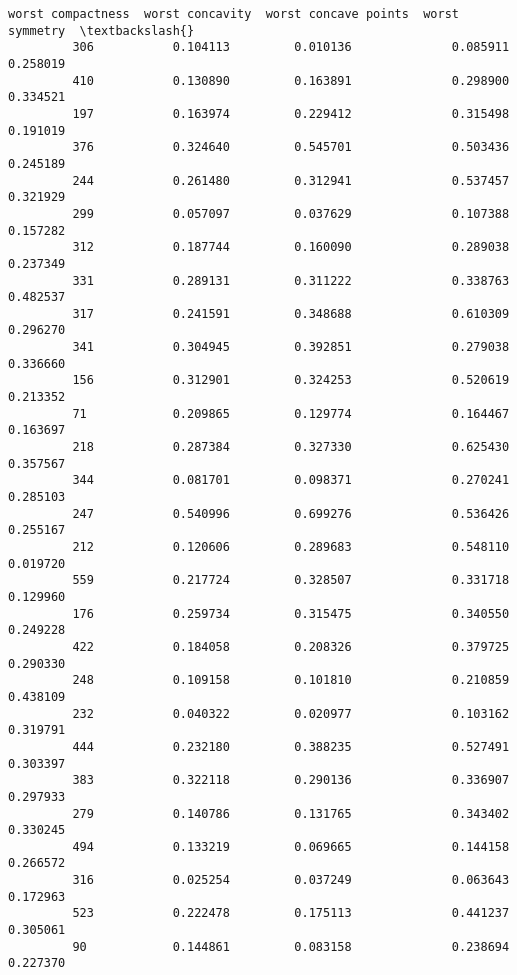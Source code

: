 \documentclass[11pt]{article}
\begin{document}
\begin{Verbatim}[commandchars=\\\{\}]
              worst compactness  worst concavity  worst concave points  worst symmetry  \textbackslash{}
         306           0.104113         0.010136              0.085911        0.258019   
         410           0.130890         0.163891              0.298900        0.334521   
         197           0.163974         0.229412              0.315498        0.191019   
         376           0.324640         0.545701              0.503436        0.245189   
         244           0.261480         0.312941              0.537457        0.321929   
         299           0.057097         0.037629              0.107388        0.157282   
         312           0.187744         0.160090              0.289038        0.237349   
         331           0.289131         0.311222              0.338763        0.482537   
         317           0.241591         0.348688              0.610309        0.296270   
         341           0.304945         0.392851              0.279038        0.336660   
         156           0.312901         0.324253              0.520619        0.213352   
         71            0.209865         0.129774              0.164467        0.163697   
         218           0.287384         0.327330              0.625430        0.357567   
         344           0.081701         0.098371              0.270241        0.285103   
         247           0.540996         0.699276              0.536426        0.255167   
         212           0.120606         0.289683              0.548110        0.019720   
         559           0.217724         0.328507              0.331718        0.129960   
         176           0.259734         0.315475              0.340550        0.249228   
         422           0.184058         0.208326              0.379725        0.290330   
         248           0.109158         0.101810              0.210859        0.438109   
         232           0.040322         0.020977              0.103162        0.319791   
         444           0.232180         0.388235              0.527491        0.303397   
         383           0.322118         0.290136              0.336907        0.297933   
         279           0.140786         0.131765              0.343402        0.330245   
         494           0.133219         0.069665              0.144158        0.266572   
         316           0.025254         0.037249              0.063643        0.172963   
         523           0.222478         0.175113              0.441237        0.305061   
         90            0.144861         0.083158              0.238694        0.227370   

\end{Verbatim}
\end{document}
